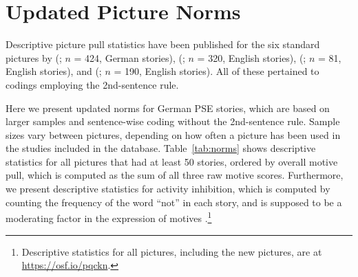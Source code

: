 \documentclass[jou,a4paper]{apa6}\usepackage[]{graphicx}\usepackage[]{color}
\begin{document}
\section{Updated Picture Norms}

Descriptive picture pull statistics have been published for the six standard pictures by \citeauthor{schultheiss_AssessmentImplicitMotives_2001} (\citeyear{schultheiss_AssessmentImplicitMotives_2001}; $n$ = 424, German stories), \citeauthor{pang_assessing_2005} (\citeyear{pang_assessing_2005}; $n$ = 320, English stories), \citeauthor{pang_ContentCodingMethods_2010} (\citeyear{pang_ContentCodingMethods_2010}; $n$ = 81, English stories), and \citeauthor{schultheiss_AreImplicitExplicit_2009} (\citeyear{schultheiss_AreImplicitExplicit_2009}; $n$ = 190, English stories). All of these pertained to codings employing the 2nd-sentence rule.

Here we present updated norms for German PSE stories, which are based on larger samples and sentence-wise coding without the 2nd-sentence rule. Sample sizes vary between pictures, depending on how often a picture has been used in the studies included in the database. Table~\ref{tab:norms} shows descriptive statistics for all pictures that had at least 50 stories, ordered by overall motive pull, which is computed as the sum of all three raw motive scores. Furthermore, we present descriptive statistics for activity inhibition, which is computed by counting the frequency of the word ``not'' in each story, and is supposed to be a moderating factor in the expression of motives \parencite{langens_ActivityInhibition_2010}.\footnote{Descriptive statistics for all pictures, including the new pictures, are at \url{https://osf.io/pqckn}.}
\end{document}
